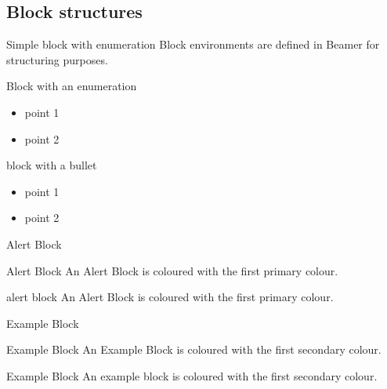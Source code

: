 \documentclass[xcolor={svgnames},12pt,aspectratio=169,handout]{beamer}
\begin{document}
\subsection{Block structures}

\begin{frame}{Simple block with enumeration}
    Block environments are defined in Beamer for structuring purposes.

    \begin{block}{Block with an enumeration}
        \begin{itemize}
            \item point 1
            \item point 2
        \end{itemize}
    \end{block}

    \begin{block}{block with a bullet}
        \begin{itemize}
            \item point 1
            \item point 2
        \end{itemize}
    \end{block}
\end{frame}

\begin{frame}[fragile]{Alert Block}
    \begin{alertblock}{Alert Block}
        An Alert Block is coloured with the first primary colour.
    \end{alertblock}

    \begin{alertblock}{alert block}
    An Alert Block is coloured with the first primary colour.
    \end{alertblock}
\end{frame}

\begin{frame}[fragile]{Example Block}
    \begin{exampleblock}{Example Block}
        An Example Block is coloured with the first secondary colour.
    \end{exampleblock}

    \begin{exampleblock}{Example Block}
    An example block is coloured with the first secondary colour.
    \end{exampleblock}
\end{frame}
\end{document}
